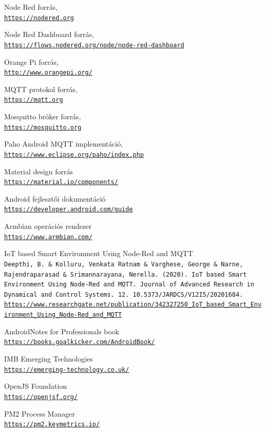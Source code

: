 \documentclass[
]{thesis-ekf}
\theoremstyle{definition}
\theoremstyle{remark}
\begin{document}
\begin{thebibliography}{2}
Node Red forrás,
\\\texttt{\url{https://nodered.org}}

Node Red Dashboard forrás,
\\\texttt{\url{https://flows.nodered.org/node/node-red-dashboard}}

Orange Pi forrás,
\\\texttt{\url{http://www.orangepi.org/}}

MQTT protokol forrás,
\\\texttt{\url{https://mqtt.org}}

Mosquitto bróker forrás,
\\\texttt{\url{https://mosquitto.org}}

Paho Android MQTT implementáció,
\\\texttt{\url{https://www.eclipse.org/paho/index.php}}

Material design forrás
\\\texttt{\url{https://material.io/components/}}

Android fejlesztői dokumentáció
\\\texttt{\url{https://developer.android.com/guide}}

Armbian operációs rendszer
\\\texttt{\url{https://www.armbian.com/}}

IoT based Smart Environment Using Node-Red and MQTT
\\\texttt{Deepthi, B. \& Kolluru, Venkata Ratnam \& Varghese, George \& Narne, Rajendraparasad \& Srimannarayana, Nerella. (2020). IoT based Smart Environment Using Node-Red and MQTT. Journal of Advanced Research in Dynamical and Control Systems. 12. 10.5373/JARDCS/V12I5/20201684.}
\\\texttt{\url{https://www.researchgate.net/publication/342327250_IoT_based_Smart_Environment_Using_Node-Red_and_MQTT}}
	
Android\texttrademark Notes for Professionals book
\\\texttt{\url{https://books.goalkicker.com/AndroidBook/}}

IMB Emerging Technologies
\\\texttt{\url{https://emerging-technology.co.uk/}}

OpenJS Foundation
\\\texttt{\url{https://openjsf.org/}}

PM2 Process Manager
\\\texttt{\url{https://pm2.keymetrics.io/}}

\end{thebibliography}
%
\end{document}
